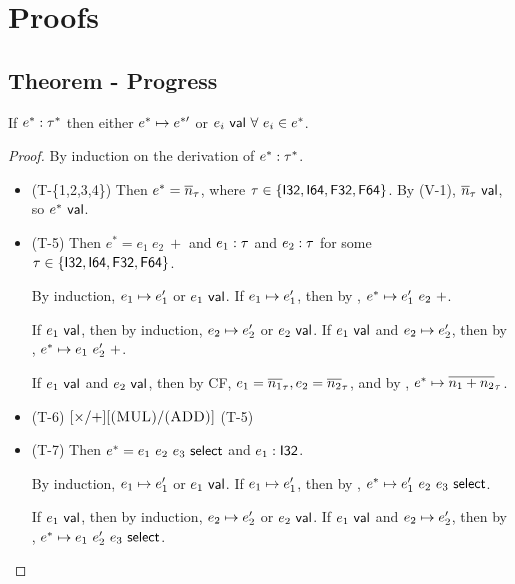 \documentclass{article}
\begin{document}
\section{Proofs}
\subsection{Theorem - Progress}
If $e^* : \tau^*$ then either $e^*\mapsto e^{*\prime}$ or $e_i ~\mathsf{val}~ \forall~ e_i \in e^*$.
\begin{proof}
    By induction on the derivation of $e^* : \tau^*$.
    \begin{itemize}
        \item (T-\{1,2,3,4\})
            Then $e^* = \overline{n}_\tau$, where $\tau \in \{\mathsf{I32}, \mathsf{I64}, \mathsf{F32}, \mathsf{F64}\}$.
            By (V-1), $\overline{n}_\tau ~\mathsf{val}$, so $e^* ~\mathsf{val}$.
        
        \item (T-5)
            Then $e^* = e_1~ e_2~ +$ and $e_1 : \tau$ and $e_2 : \tau$ for some $\tau \in \{\mathsf{I32}, \mathsf{I64}, \mathsf{F32}, \mathsf{F64}\}$.
            
            By induction, $e_1 \mapsto e_1'$ or $e_1 ~\mathsf{val}$.
            If $e_1 \mapsto e_1'$, then by , $e^* \mapsto e_1'~ e_2~ +$.
            
            If $e_1 ~\mathsf{val}$, then by induction, $e_2 \mapsto e_2'$ or $e_2 ~\mathsf{val}$.
            If $e_1 ~\mathsf{val}$ and $e_2 \mapsto e_2'$, then by , $e^* \mapsto e_1~ e_2'~ +$.
            
            If $e_1 ~\mathsf{val}$ and $e_2 ~\mathsf{val}$, then by CF, $e_1 = \overline{n_1}_\tau, e_2 = \overline{n_2}_\tau$, and by , $e^* \mapsto \overline{n_1 + n_2}_\tau$.
        
        \item (T-6)
            $[\times / +][\textsc{(MUL)} / \textsc{(ADD)}]$ (T-5)
        
        \item (T-7)
            Then $e^* = e_1 ~ e_2 ~ e_3 ~ \mathsf{select}$ and $e_1 : \mathsf{I32}$. %
            
            By induction, $e_1 \mapsto e_1'$ or $e_1 ~\mathsf{val}$.
            If $e_1 \mapsto e_1'$, then by , $e^* \mapsto e_1' ~ e_2 ~ e_3 ~ \mathsf{select}$.
            
            If $e_1 ~\mathsf{val}$, then by induction, $e_2 \mapsto e_2'$ or $e_2 ~\mathsf{val}$.
            If $e_1 ~\mathsf{val}$ and $e_2 \mapsto e_2'$, then by , $e^* \mapsto e_1 ~ e_2' ~ e_3 ~ \mathsf{select}$.
            

\end{itemize}
\end{proof}
\end{document}
